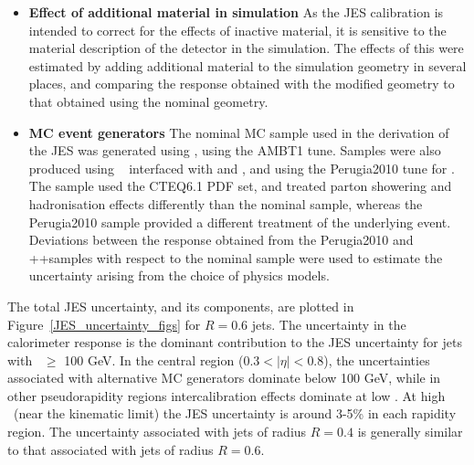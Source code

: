 \begin{itemize}
\item{ \bf Effect of additional material in simulation} As the JES calibration is intended to correct for the effects of inactive material, it is sensitive to the material description of the detector in the simulation. The effects of this were estimated by adding additional material to the simulation geometry in several places, and comparing the response obtained with the modified geometry to that obtained using the nominal geometry. 
\item{ \bf MC event generators}
The nominal MC sample used in the derivation of the JES was generated using \pythia, using the AMBT1 tune. Samples were also produced using \alpgen~\cite{alpgen} interfaced with \herwig and \jimmy, and using the Perugia2010 tune for \pythia. The \alpgen sample used the CTEQ6.1 PDF set, and treated parton showering and hadronisation effects differently than the nominal \pythia sample, whereas the Perugia2010 sample provided a different treatment of the underlying event. Deviations between the response obtained from the Perugia2010 and \alpgen+\herwig+\jimmy samples with respect to the nominal \pythia sample were used to estimate the uncertainty arising from the choice of physics models. 

%




\end{itemize}

The total JES uncertainty, and its components, are plotted in Figure~\ref{JES_uncertainty_figs} for $R=0.6$ jets. The uncertainty in the calorimeter response is the dominant contribution to the JES uncertainty for jets with \pt~$\geq$ 100 GeV. In the central region ($0.3 < |\eta| < 0.8$), the uncertainties associated with alternative MC generators dominate below 100 GeV, while in other pseudorapidity regions intercalibration effects dominate at low \pt. At high \pt~(near the kinematic limit) the JES uncertainty is around 3-5\% in each rapidity region. The uncertainty associated with jets of radius $R=0.4$ is generally similar to that associated with jets of radius $R=0.6$.

 
